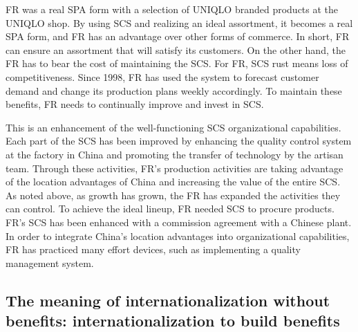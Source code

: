 \documentclass[12pt,]{article}
\begin{document}
FR was a real SPA form with a selection of UNIQLO branded products at
the UNIQLO shop. By using SCS and realizing an ideal assortment, it
becomes a real SPA form, and FR has an advantage over other forms of
commerce. In short, FR can ensure an assortment that will satisfy its
customers. On the other hand, the FR has to bear the cost of maintaining
the SCS. For FR, SCS rust means loss of competitiveness. Since 1998, FR
has used the system to forecast customer demand and change its
production plans weekly accordingly. To maintain these benefits, FR
needs to continually improve and invest in SCS.

This is an enhancement of the well-functioning SCS organizational
capabilities. Each part of the SCS has been improved by enhancing the
quality control system at the factory in China and promoting the
transfer of technology by the artisan team. Through these activities,
FR's production activities are taking advantage of the location
advantages of China and increasing the value of the entire SCS. As noted
above, as growth has grown, the FR has expanded the activities they can
control. To achieve the ideal lineup, FR needed SCS to procure products.
FR's SCS has been enhanced with a commission agreement with a Chinese
plant. In order to integrate China's location advantages into
organizational capabilities, FR has practiced many effort devices, such
as implementing a quality management system.

\hypertarget{the-meaning-of-internationalization-without-benefits-internationalization-to-build-benefits}{%
\subsection{The meaning of internationalization without benefits:
internationalization to build
benefits}\label{the-meaning-of-internationalization-without-benefits-internationalization-to-build-benefits}}
\end{document}
